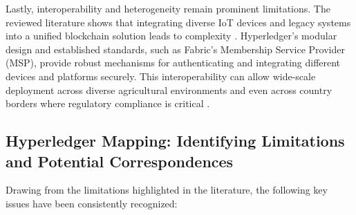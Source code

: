 \documentclass[12pt,onecolumn]{IEEEtran} %
\begin{document}
Lastly, interoperability and heterogeneity remain prominent limitations. The reviewed literature shows that integrating diverse IoT devices and legacy systems into a unified blockchain solution leads to complexity \cite{aliyu2023blockchainbasedsmartfarm, tang2024assessingblockchainand}. Hyperledger's modular design and established standards, such as Fabric's Membership Service Provider (MSP), provide robust mechanisms for authenticating and integrating different devices and platforms securely. This interoperability can allow wide-scale deployment across diverse agricultural environments and even across country borders where regulatory compliance is critical \cite{sakthivel2024enhancingtransparencyand, bosona2023theroleof}.

  \subsection{Hyperledger Mapping: Identifying Limitations and Potential Correspondences}\label{subsec:hyperledger-mapping}
Drawing from the limitations highlighted in the literature, the following key issues have been consistently recognized:
\end{document}

